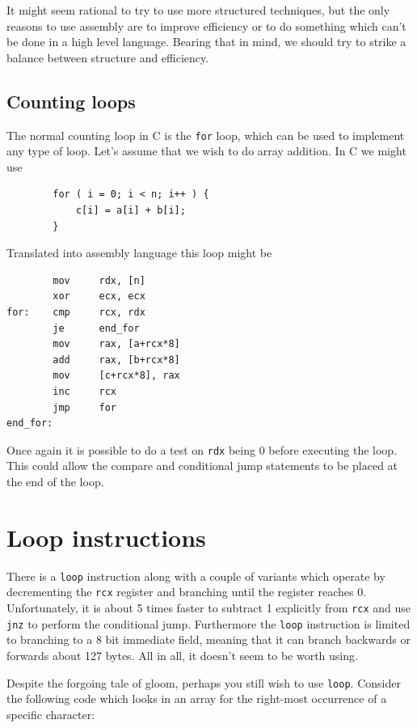 \documentclass[11pt,b5paper]{book}
\begin{document}
It might seem rational to try to use more structured techniques, but the only reasons
to use assembly are to improve efficiency or to do something which can't be done in a high level
language.
Bearing that in mind, we should try to strike a balance between
structure and efficiency.

\subsection{Counting loops}

The normal counting loop in C is the {\tt for} loop, which can be used to implement any type of loop. 
Let's assume that we wish to do array addition.
In C we might use

\begin{verbatim}
        for ( i = 0; i < n; i++ ) {
            c[i] = a[i] + b[i];
        }
\end{verbatim}

Translated into assembly language this loop might be

\begin{verbatim}
        mov     rdx, [n]
        xor     ecx, ecx
for:    cmp     rcx, rdx
        je      end_for
        mov     rax, [a+rcx*8]
        add     rax, [b+rcx*8]
        mov     [c+rcx*8], rax
        inc     rcx
        jmp     for
end_for:
\end{verbatim}

Once again it is possible to do a test on {\tt rdx} being 0 before executing the loop.
This could allow the compare and conditional jump statements to be placed at the end of the loop.

\section{Loop instructions}

There is a {\tt loop} instruction along with a couple of variants which operate by decrementing the 
{\tt rcx} register and branching until the register reaches 0.
Unfortunately, it is about 5 times faster to subtract 1 explicitly from {\tt rcx} and use {\tt jnz} to
perform the conditional jump.
Furthermore the {\tt loop} instruction is limited to branching to a 8 bit immediate field, meaning that it
can branch backwards or forwards about 127 bytes.
All in all, it doesn't seem to be worth using.

Despite the forgoing tale of gloom, perhaps you still wish to use {\tt loop}.
Consider the following code which looks in an array for the right-most occurrence of a specific
character:
\end{document}
